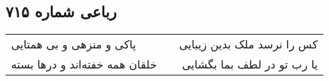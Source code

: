 \begin{center}
\section*{رباعی شماره ۷۱۵}
\label{sec:sh715}
\begin{longtable}{l p{0.5cm} r}
پاکی و منزهی و بی همتایی
&&
کس را نرسد ملک بدین زیبایی
\\
خلقان همه خفته‌اند و درها بسته
&&
یا رب تو در لطف بما بگشایی
\\
\end{longtable}
\end{center}
